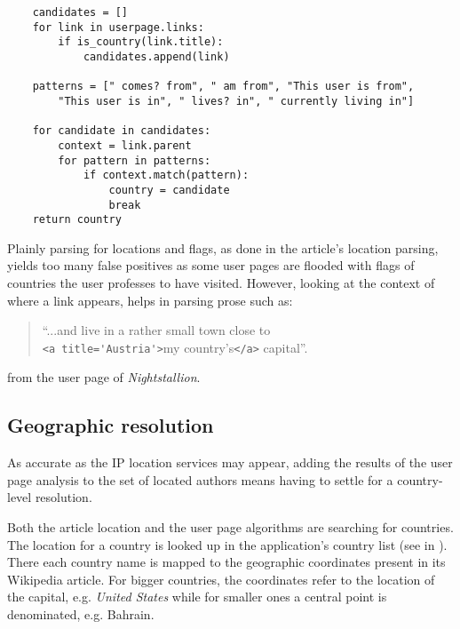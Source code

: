 \begin{lstlisting}
	candidates = []
	for link in userpage.links:
		if is_country(link.title):
			candidates.append(link)

	patterns = [" comes? from", " am from", "This user is from", 
		"This user is in", " lives? in", " currently living in"]
		
	for candidate in candidates:
		context = link.parent
		for pattern in patterns:
			if context.match(pattern):
				country = candidate
				break
	return country
\end{lstlisting}

Plainly parsing for locations and flags, as done in the article's location parsing, yields too many false positives as some user pages are flooded with flags of countries the user professes to have visited.
However, looking at the context of where a link appears, helps in parsing prose such as:
\begin{quotation}
 ``...and live in a rather small town close to \\\verb"<a title='Austria'>"my country's\verb"</a>" capital''.
\end{quotation}
from the user page of \emph{Nightstallion}.


\subsection{Geographic resolution}\label{sub:resolution}

As accurate as the \ac{IP} location services may appear, adding the results of the user page analysis to the set of located authors means having to settle for a country-level resolution.

Both the article location and the user page algorithms are searching for countries.
The location for a country is looked up in the application's country list (see  in ).
There each country name is mapped to the geographic coordinates present in its Wikipedia article.
For bigger countries, the coordinates refer to the location of the capital, e.g. \emph{United States} while for smaller ones a central point is denominated, e.g. Bahrain.

